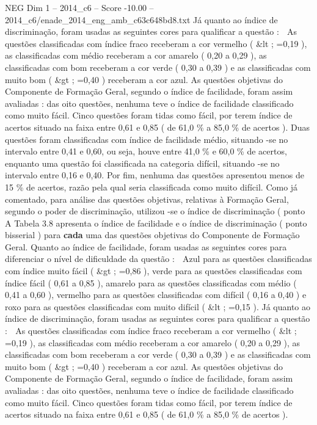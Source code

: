 \begin{textsample}{NEG Dim 1 – 2014\_c6 – Score -10.00 – 2014\_c6/enade\_2014\_eng\_amb\_c63c648bd8.txt}
Já quanto ao índice de discriminação, foram usadas as seguintes cores para qualificar a questão :  As questões classificadas com índice fraco receberam a cor vermelho ( \&lt ; =0,19 ), as classificadas com médio receberam a cor amarelo ( 0,20 a 0,29 ), as classificadas com bom receberam a cor verde ( 0,30 a 0,39 ) e as classificadas com muito bom ( \&gt ; =0,40 ) receberam a cor azul.
As questões objetivas do Componente de Formação Geral, segundo o índice de facilidade, foram assim avaliadas : das oito questões, nenhuma teve o índice de facilidade classificado como muito fácil.
Cinco questões foram tidas como fácil, por terem índice de acertos situado na faixa entre 0,61 e 0,85 ( de 61,0 \% a 85,0 \% de acertos ).
Duas questões foram classificadas com índice de facilidade médio, situando -se no intervalo entre 0,41 e 0,60, ou seja, houve entre 41,0 \% e 60,0 \% de acertos, enquanto uma questão foi classificada na categoria difícil, situando -se no intervalo entre 0,16 e 0,40.
Por fim, nenhuma das questões apresentou menos de 15 \% de acertos, razão pela qual seria classificada como muito difícil.
Como já comentado, para análise das questões objetivas, relativas à Formação Geral, segundo o poder de discriminação, utilizou -se o índice de discriminação ( ponto A Tabela 3.8 apresenta o índice de facilidade e o índice de discriminação ( ponto bisserial ) para \textbf{cada} uma das questões objetivas do Componente de Formação Geral.
Quanto ao índice de facilidade, foram usadas as seguintes cores para diferenciar o nível de dificuldade da questão :  Azul para as questões classificadas com índice muito fácil ( \&gt ; =0,86 ), verde para as questões classificadas com índice fácil ( 0,61 a 0,85 ), amarelo para as questões classificadas com médio ( 0,41 a 0,60 ), vermelho para as questões classificadas com difícil ( 0,16 a 0,40 ) e roxo para as questões classificadas com muito difícil ( \&lt ; =0,15 ).
Já quanto ao índice de discriminação, foram usadas as seguintes cores para qualificar a questão :  As questões classificadas com índice fraco receberam a cor vermelho ( \&lt ; =0,19 ), as classificadas com médio receberam a cor amarelo ( 0,20 a 0,29 ), as classificadas com bom receberam a cor verde ( 0,30 a 0,39 ) e as classificadas com muito bom ( \&gt ; =0,40 ) receberam a cor azul.
As questões objetivas do Componente de Formação Geral, segundo o índice de facilidade, foram assim avaliadas : das oito questões, nenhuma teve o índice de facilidade classificado como muito fácil.
Cinco questões foram tidas como fácil, por terem índice de acertos situado na faixa entre 0,61 e 0,85 ( de 61,0 \% a 85,0 \% de acertos ).

\end{textsample}
